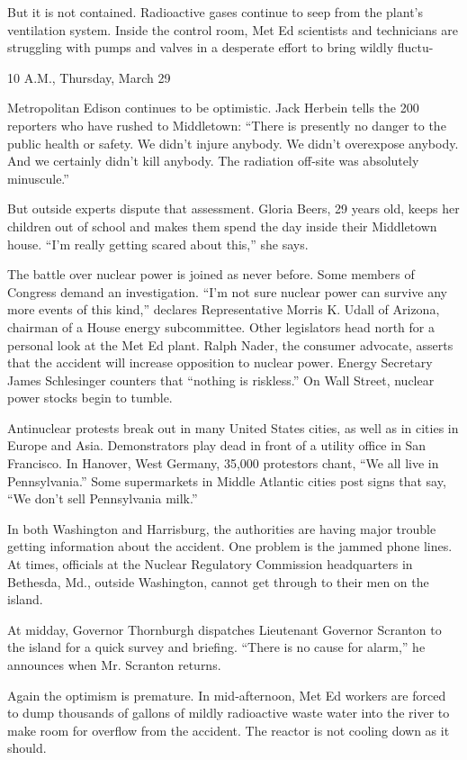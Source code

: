 But it is not contained. Radioactive gases continue to seep from the
plant's ventilation system. Inside the control room, Met Ed scientists
and technicians are struggling with pumps and valves in a desperate
effort to bring wildly fluctu-

10 A.M., Thursday, March 29

Metropolitan Edison continues to be optimistic. Jack Herbein tells the
200 reporters who have rushed to Middletown: ``There is presently no
danger to the public health or safety. We didn't injure anybody. We
didn't overexpose anybody. And we certainly didn't kill anybody. The
radiation off‐site was absolutely minuscule.''

But outside experts dispute that assessment. Gloria Beers, 29 years old,
keeps her children out of school and makes them spend the day inside
their Middletown house. ``I'm really getting scared about this,'' she
says.

The battle over nuclear power is joined as never before. Some members of
Congress demand an investigation. ``I'm not sure nuclear power can
survive any more events of this kind,'' declares Representative Morris
K. Udall of Arizona, chairman of a House energy subcommittee. Other
legislators head north for a personal look at the Met Ed plant. Ralph
Nader, the consumer advocate, asserts that the accident will increase
opposition to nuclear power. Energy Secretary James Schlesinger counters
that ``nothing is riskless.'' On Wall Street, nuclear power stocks begin
to tumble.

Antinuclear protests break out in many United States cities, as well as
in cities in Europe and Asia. Demonstrators play dead in front of a
utility office in San Francisco. In Hanover, West Germany, 35,000
protestors chant, ``We all live in Pennsylvania.'' Some supermarkets in
Middle Atlantic cities post signs that say, ``We don't sell Pennsylvania
milk.''

In both Washington and Harrisburg, the authorities are having major
trouble getting information about the accident. One problem is the
jammed phone lines. At times, officials at the Nuclear Regulatory
Commission headquarters in Bethesda, Md., outside Washington, cannot get
through to their men on the island.

At midday, Governor Thornburgh dispatches Lieutenant Governor Scranton
to the island for a quick survey and briefing. ``There is no cause for
alarm,'' he announces when Mr. Scranton returns.

Again the optimism is premature. In mid‐afternoon, Met Ed workers are
forced to dump thousands of gallons of mildly radioactive waste water
into the river to make room for overflow from the accident. The reactor
is not cooling down as it should.

